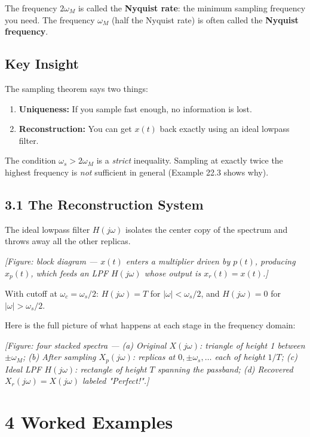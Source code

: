 \documentclass[11pt]{article}
\begin{document}
The frequency $2\omega_M$ is called the \textbf{Nyquist rate}: the minimum sampling frequency you need. The frequency $\omega_M$ (half the Nyquist rate) is often called the \textbf{Nyquist frequency}.

\subsection*{Key Insight}

The sampling theorem says two things:

\begin{enumerate}
  \item \textbf{Uniqueness:} If you sample fast enough, no information is lost.
  \item \textbf{Reconstruction:} You can get $x(t)$ back exactly using an ideal lowpass filter.
\end{enumerate}

The condition $\omega_s > 2\omega_M$ is a \textit{strict} inequality. Sampling at exactly twice the highest frequency is \textit{not} sufficient in general (Example 22.3 shows why).

\subsection*{3.1 The Reconstruction System}

The ideal lowpass filter $H(j\omega)$ isolates the center copy of the spectrum and throws away all the other replicas.

\textit{[Figure: block diagram — $x(t)$ enters a multiplier driven by $p(t)$, producing $x_p(t)$, which feeds an LPF $H(j\omega)$ whose output is $x_r(t) = x(t)$.]}

With cutoff at $\omega_c = \omega_s/2$: $H(j\omega) = T$ for $|\omega| < \omega_s/2$, and $H(j\omega) = 0$ for $|\omega| > \omega_s/2$.

Here is the full picture of what happens at each stage in the frequency domain:

\textit{[Figure: four stacked spectra — (a) Original $X(j\omega)$: triangle of height 1 between $\pm\omega_M$; (b) After sampling $X_p(j\omega)$: replicas at $0,\pm\omega_s,\ldots$ each of height $1/T$; (c) Ideal LPF $H(j\omega)$: rectangle of height $T$ spanning the passband; (d) Recovered $X_r(j\omega) = X(j\omega)$ labeled "Perfect!".]}

\section*{4 Worked Examples}
\end{document}
